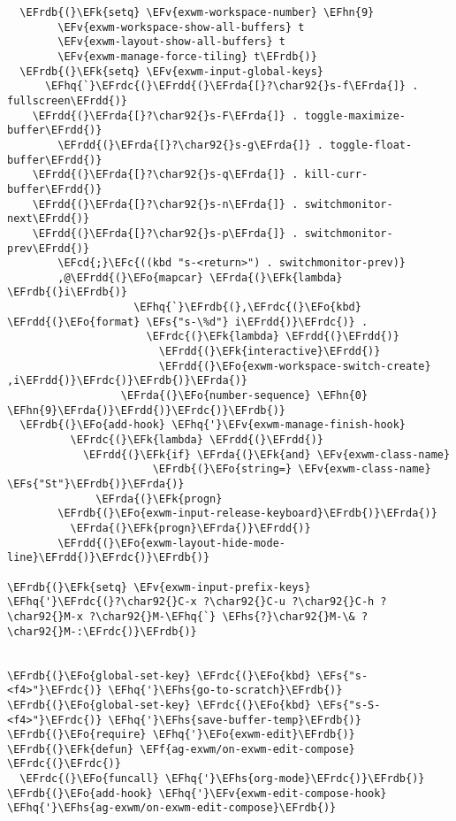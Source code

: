 \documentclass[a4wide,10pt]{article}
\newcommand{\EFc}[1]{\textcolor{EFc}{#1}} %
\newcommand{\EFcd}[1]{\textcolor{EFcd}{#1}} %
\newcommand{\EFs}[1]{\textcolor{EFs}{#1}} %
\newcommand{\EFk}[1]{\textcolor{EFk}{#1}} %
\newcommand{\EFf}[1]{\textcolor{EFf}{#1}} %
\newcommand{\EFv}[1]{\textcolor{EFv}{#1}} %
\newcommand{\EFo}[1]{\textcolor{EFo}{#1}} %
\newcommand{\EFhn}[1]{\textcolor{EFhn}{\textbf{#1}}} %
\newcommand{\EFhq}[1]{\textcolor{EFhq}{#1}} %
\newcommand{\EFhs}[1]{\textcolor{EFhs}{#1}} %
\newcommand{\EFrda}[1]{\textcolor{EFrda}{#1}} %
\newcommand{\EFrdb}[1]{\textcolor{EFrdb}{#1}} %
\newcommand{\EFrdc}[1]{\textcolor{EFrdc}{#1}} %
\newcommand{\EFrdd}[1]{\textcolor{EFrdd}{#1}} %
\begin{document}
\begin{Code}
\begin{Verbatim}
  \EFrdb{(}\EFk{setq} \EFv{exwm-workspace-number} \EFhn{9}
        \EFv{exwm-workspace-show-all-buffers} t
        \EFv{exwm-layout-show-all-buffers} t
        \EFv{exwm-manage-force-tiling} t\EFrdb{)}
  \EFrdb{(}\EFk{setq} \EFv{exwm-input-global-keys}
      \EFhq{`}\EFrdc{(}\EFrdd{(}\EFrda{[}?\char92{}s-f\EFrda{]} . fullscreen\EFrdd{)}
	\EFrdd{(}\EFrda{[}?\char92{}s-F\EFrda{]} . toggle-maximize-buffer\EFrdd{)}
        \EFrdd{(}\EFrda{[}?\char92{}s-g\EFrda{]} . toggle-float-buffer\EFrdd{)}
	\EFrdd{(}\EFrda{[}?\char92{}s-q\EFrda{]} . kill-curr-buffer\EFrdd{)}
	\EFrdd{(}\EFrda{[}?\char92{}s-n\EFrda{]} . switchmonitor-next\EFrdd{)}
	\EFrdd{(}\EFrda{[}?\char92{}s-p\EFrda{]} . switchmonitor-prev\EFrdd{)}
        \EFcd{;}\EFc{((kbd "s-<return>") . switchmonitor-prev)}
        ,@\EFrdd{(}\EFo{mapcar} \EFrda{(}\EFk{lambda} \EFrdb{(}i\EFrdb{)}
                    \EFhq{`}\EFrdb{(},\EFrdc{(}\EFo{kbd} \EFrdd{(}\EFo{format} \EFs{"s-\%d"} i\EFrdd{)}\EFrdc{)} .
                      \EFrdc{(}\EFk{lambda} \EFrdd{(}\EFrdd{)}
                        \EFrdd{(}\EFk{interactive}\EFrdd{)}
                        \EFrdd{(}\EFo{exwm-workspace-switch-create} ,i\EFrdd{)}\EFrdc{)}\EFrdb{)}\EFrda{)}
                  \EFrda{(}\EFo{number-sequence} \EFhn{0} \EFhn{9}\EFrda{)}\EFrdd{)}\EFrdc{)}\EFrdb{)}
  \EFrdb{(}\EFo{add-hook} \EFhq{'}\EFv{exwm-manage-finish-hook}
          \EFrdc{(}\EFk{lambda} \EFrdd{(}\EFrdd{)}
            \EFrdd{(}\EFk{if} \EFrda{(}\EFk{and} \EFv{exwm-class-name}
                       \EFrdb{(}\EFo{string=} \EFv{exwm-class-name} \EFs{"St"}\EFrdb{)}\EFrda{)}
              \EFrda{(}\EFk{progn}
		\EFrdb{(}\EFo{exwm-input-release-keyboard}\EFrdb{)}\EFrda{)}
	      \EFrda{(}\EFk{progn}\EFrda{)}\EFrdd{)}
	    \EFrdd{(}\EFo{exwm-layout-hide-mode-line}\EFrdd{)}\EFrdc{)}\EFrdb{)}

\EFrdb{(}\EFk{setq} \EFv{exwm-input-prefix-keys}
\EFhq{'}\EFrdc{(}?\char92{}C-x ?\char92{}C-u ?\char92{}C-h ?\char92{}M-x ?\char92{}M-\EFhq{`} \EFhs{?}\char92{}M-\& ?\char92{}M-:\EFrdc{)}\EFrdb{)}


\EFrdb{(}\EFo{global-set-key} \EFrdc{(}\EFo{kbd} \EFs{"s-<f4>"}\EFrdc{)} \EFhq{'}\EFhs{go-to-scratch}\EFrdb{)}
\EFrdb{(}\EFo{global-set-key} \EFrdc{(}\EFo{kbd} \EFs{"s-S-<f4>"}\EFrdc{)} \EFhq{'}\EFhs{save-buffer-temp}\EFrdb{)}
\EFrdb{(}\EFo{require} \EFhq{'}\EFo{exwm-edit}\EFrdb{)}
\EFrdb{(}\EFk{defun} \EFf{ag-exwm/on-exwm-edit-compose} \EFrdc{(}\EFrdc{)}
  \EFrdc{(}\EFo{funcall} \EFhq{'}\EFhs{org-mode}\EFrdc{)}\EFrdb{)}
\EFrdb{(}\EFo{add-hook} \EFhq{'}\EFv{exwm-edit-compose-hook} \EFhq{'}\EFhs{ag-exwm/on-exwm-edit-compose}\EFrdb{)}



\end{Verbatim}
\end{Code}
\end{document}
